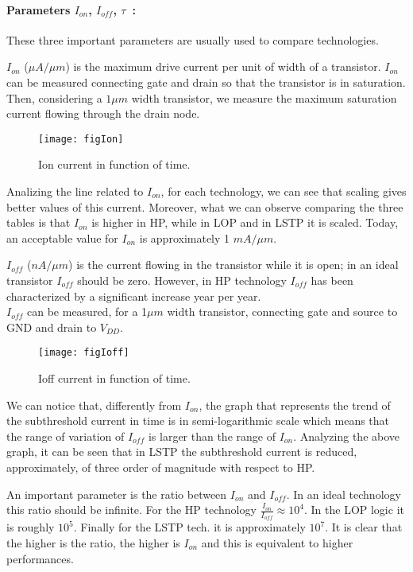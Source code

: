 \documentclass[a4paper, 12pt, twoside, openright]{report}
\begin{document}
\paragraph{Parameters $I_{on}$, $I_{off}$, $\tau$~:} These three important parameters are usually used to compare technologies. 

$I_{on}$ ($\mu A/\mu m$) is the maximum drive current per unit of width of a transistor. $I_{on}$ can be measured connecting gate and drain so that the transistor is in saturation. Then, considering a $1 \mu m$ width transistor, we measure the maximum saturation current flowing through the drain node.

	\begin{figure}[h]
	\centering
	\texttt{[image: figIon]}
	\caption{Ion current in function of time.}
	\label{}
	\end{figure}

Analizing the line related to $I_{on}$, for each technology, we can see that scaling gives better values of this current. Moreover, what we can observe comparing the three tables is that $I_{on}$ is higher in HP, while in LOP and in LSTP it is scaled. Today, an acceptable value for $I_{on}$ is approximately 1 $mA/\mu m$.

$I_{off}$ ($nA/\mu m$) is the current flowing in the transistor while it is open; in an ideal transistor $I_{off}$ should be zero. However, in HP technology $I_{off}$ has been characterized by a significant increase year per year.\\
$I_{off}$ can be measured, for a 1$\mu m$ width transistor, connecting gate and source to GND and drain to $V_{DD}$.

	\begin{figure}[h]
	\centering
	\texttt{[image: figIoff]}
	\caption{Ioff current in function of time.}
	\label{}
	\end{figure}

We can notice that, differently from $I_{on}$, the graph that represents the trend of the subthreshold current in time is in semi-logarithmic scale which means that the range of variation of $I_{off}$ is larger than the range of $I_{on}$. Analyzing the above graph, it can be seen that in LSTP the subthreshold current is reduced, approximately, of three order of magnitude with respect to HP.

An important parameter is the ratio between $I_{on}$ and $I_{off}$. In an ideal technology this ratio should be infinite. For the HP technology $\frac{I_{on}}{I_{off}} \approx 10^4$. In the LOP logic it is roughly $10^5$. Finally for the LSTP tech. it is approximately $10^7$. It is clear that the higher is the ratio, the higher is $I_{on}$ and this is equivalent to higher performances.
\end{document}
